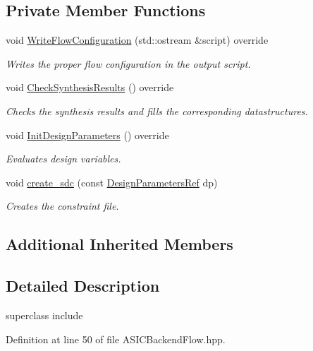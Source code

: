 \subsection*{Private Member Functions}
\begin{DoxyCompactItemize}
\item 
void \hyperlink{classASICBackendFlow_ad296b0fd80a9e230b178d28aba056ac0}{Write\+Flow\+Configuration} (std\+::ostream \&script) override
\begin{DoxyCompactList}\small\item\em Writes the proper flow configuration in the output script. \end{DoxyCompactList}\item 
void \hyperlink{classASICBackendFlow_a1c6c74532caa4054624b4ffeac49114f}{Check\+Synthesis\+Results} () override
\begin{DoxyCompactList}\small\item\em Checks the synthesis results and fills the corresponding datastructures. \end{DoxyCompactList}\item 
void \hyperlink{classASICBackendFlow_a57e6be510f2b198c19d47cc6e7e2d0ab}{Init\+Design\+Parameters} () override
\begin{DoxyCompactList}\small\item\em Evaluates design variables. \end{DoxyCompactList}\item 
void \hyperlink{classASICBackendFlow_a3ae8c5df3e6ab613cee0e21df62f26a1}{create\+\_\+sdc} (const \hyperlink{DesignParameters_8hpp_ae36bb1c4c9150d0eeecfe1f96f42d157}{Design\+Parameters\+Ref} dp)
\begin{DoxyCompactList}\small\item\em Creates the constraint file. \end{DoxyCompactList}\end{DoxyCompactItemize}
\subsection*{Additional Inherited Members}


\subsection{Detailed Description}
superclass include 

Definition at line 50 of file A\+S\+I\+C\+Backend\+Flow.\+hpp.



